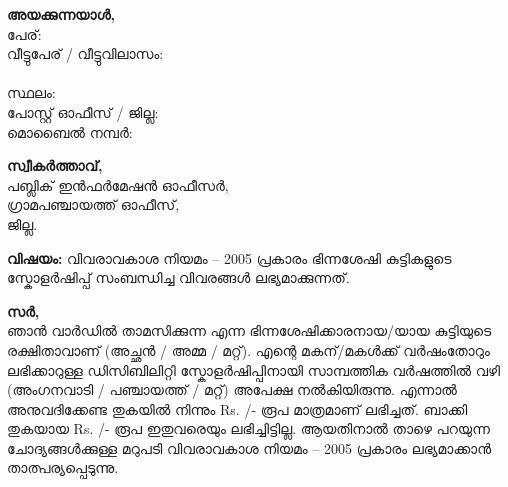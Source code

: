 \documentclass[12pt,a4paper]{article}
\begin{document}
	
	\noindent
	\begin{minipage}[t]{0.58\textwidth}
		\textbf{അയക്കുന്നയാൾ,} \\[0.1cm]
		പേര്: \dotfill\null \\[0.15cm]
		വീട്ടുപേര് / വീട്ടുവിലാസം: \dotfill\null \\[0.15cm]
		\hspace*{3.4cm} \dotfill\null \\[0.15cm]
		സ്ഥലം: \dotfill\null \\[0.15cm]
		പോസ്റ്റ് ഓഫീസ് / ജില്ല: \dotfill\null \\[0.15cm]
		മൊബൈൽ നമ്പർ: \dotfill\null
	\end{minipage}
	\hfill
	\begin{minipage}[t]{0.38\textwidth}
		\centering
		\setlength{\fboxrule}{0.8pt}
	\end{minipage}
	
	\vspace{0.4cm}
	
	\noindent
	\textbf{സ്വീകർത്താവ്,} \\
	പബ്ലിക് ഇൻഫർമേഷൻ ഓഫീസർ, \\
	\makebox[6cm]{\dotfill} ഗ്രാമപഞ്ചായത്ത് ഓഫീസ്, \\
	\makebox[6cm]{\dotfill} ജില്ല.
	
	\vspace{0.3cm}
	
	\noindent
	\textbf{വിഷയം:} വിവരാവകാശ നിയമം – 2005 പ്രകാരം ഭിന്നശേഷി കുട്ടികളുടെ സ്കോളർഷിപ്പ് സംബന്ധിച്ച വിവരങ്ങൾ ലഭ്യമാക്കുന്നത്.
	
	\vspace{0.2cm}
	
	\noindent
	\textbf{സർ,} \\
	ഞാൻ \makebox[3.0cm]{\dotfill} വാർഡിൽ താമസിക്കുന്ന \makebox[6cm]{\dotfill} എന്ന ഭിന്നശേഷിക്കാരനായ/യായ കുട്ടിയുടെ രക്ഷിതാവാണ് (അച്ഛൻ / അമ്മ / മറ്റ്). എന്റെ മകന്/മകൾക്ക് വർഷംതോറും ലഭിക്കാറുള്ള ഡിസിബിലിറ്റി സ്കോളർഷിപ്പിനായി \makebox[2.5cm]{\dotfill} സാമ്പത്തിക വർഷത്തിൽ \makebox[3.5cm]{\dotfill} വഴി (അംഗനവാടി / പഞ്ചായത്ത് / മറ്റ്) അപേക്ഷ നൽകിയിരുന്നു. എന്നാൽ അനുവദിക്കേണ്ട തുകയിൽ നിന്നും Rs. \makebox[2.5cm]{\dotfill}/- രൂപ മാത്രമാണ് ലഭിച്ചത്. ബാക്കി തുകയായ Rs. \makebox[2.5cm]{\dotfill}/- രൂപ ഇതുവരെയും ലഭിച്ചിട്ടില്ല. ആയതിനാൽ താഴെ പറയുന്ന ചോദ്യങ്ങൾക്കുള്ള മറുപടി വിവരാവകാശ നിയമം – 2005 പ്രകാരം ലഭ്യമാക്കാൻ താത്പര്യപ്പെടുന്നു.
	
\end{document}

